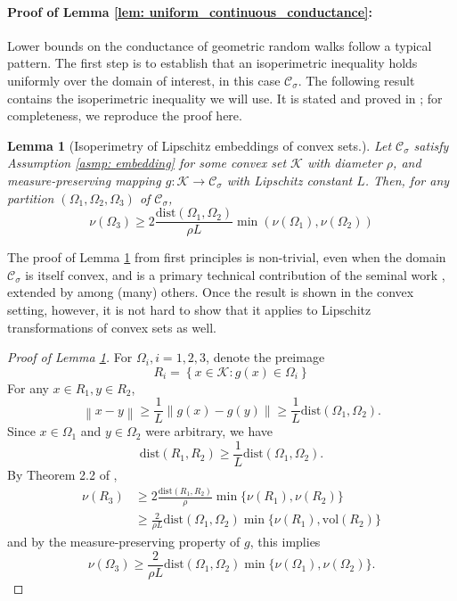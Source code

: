\documentclass[11pt,twoside]{article}
\newtheorem{lemma}{Lemma}
\newcommand{\set}[1]{\left\{#1\right\}}
\newcommand{\vol}{\mathrm{vol}}
\newcommand{\norm}[1]{\left\lVert#1\right\rVert}
\newcommand{\1}{\mathbf{1}}
\newcommand{\dist}{\mathrm{dist}}
\newcommand{\Cset}{\mathcal{C}}
\newcommand{\Csig}{\Cset_{\sigma}}
\begin{document}
\paragraph{Proof of Lemma \ref{lem: uniform_continuous_conductance}:}
Lower bounds on the conductance of geometric random walks follow a typical pattern. The first step is to establish that an isoperimetric inequality holds uniformly over the domain of interest, in this case $\Csig$. The following result contains the isoperimetric inequality we will use. It is stated and proved in \cite{abbasi-yadkori2016a}; for completeness, we reproduce the proof here.
\begin{lemma}[Isoperimetry of Lipschitz embeddings of convex sets.]
	\label{lem: nonconvex_isoperimetry}
	Let $\Csig$ satisfy Assumption \ref{asmp: embedding} for some convex set $\mathcal{K}$ with diameter $\rho$, and measure-preserving mapping $g: \mathcal{K} \to \Csig$ with Lipschitz constant $L$. Then, for any partition $(\Omega_1,\Omega_2,\Omega_3)$ of $\Csig$, 
	\begin{equation*}
	\nu(\Omega_3) \geq 2\frac{\dist(\Omega_1, \Omega_2)}{\rho L} \min(\nu(\Omega_1), \nu(\Omega_2))
	\end{equation*}
\end{lemma}
The proof of Lemma \ref{lem: nonconvex_isoperimetry} from first principles is non-trivial, even when the domain $\Csig$ is itself convex, and is a primary technical contribution of the seminal work \cite{lovasz1990}, extended by \cite{dyer1991} among (many) others. Once the result is shown in the convex setting, however, it is not hard to show that it applies to Lipschitz transformations of convex sets as well.
\begin{proof}[Proof of Lemma \ref{lem: nonconvex_isoperimetry}]
	For $\Omega_i, i = 1,2,3$, denote the preimage
	\begin{equation*}
	R_i = \set{x \in \mathcal{K}: g(x) \in \Omega_i}
	\end{equation*}
	For any $x \in R_1, y \in R_2$, 
	\begin{equation*}
	\norm{x - y} \geq \frac{1}{L}\norm{g(x) - g(y)} \geq \frac{1}{L} \dist(\Omega_1, \Omega_2). 
	\end{equation*}
	Since $x \in \Omega_1$ and $y \in \Omega_2$ were arbitrary, we have
	\begin{equation*}
	\dist(R_1, R_2) \geq \frac{1}{L} \dist(\Omega_1, \Omega_2).
	\end{equation*}
	By Theorem 2.2 of \cite{lovasz1990},
	\begin{align*}
	\nu(R_3) & \geq 2\frac{\dist(R_1, R_2)}{\rho} \min \{\nu(R_1), \nu(R_2)\} \\
	& \geq \frac{2}{\rho L} \dist(\Omega_1, \Omega_2) \min\{\nu(R_1), \vol(R_2)\}
	\end{align*}
	and by the measure-preserving property of $g$, this implies
	\begin{equation*}
	\nu(\Omega_3) \geq\frac{2}{\rho L} \dist(\Omega_1, \Omega_2) \min\{\nu(\Omega_1), \nu(\Omega_2)\}.
	\end{equation*}
\end{proof}
\end{document}
